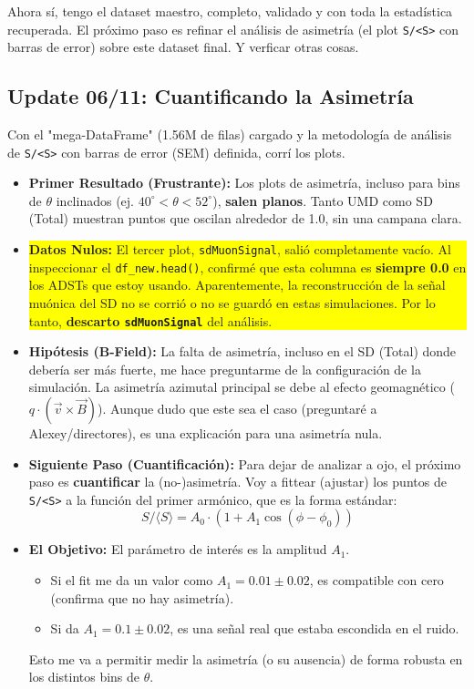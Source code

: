 Ahora sí, tengo el dataset maestro, completo, validado y con toda la estadística recuperada. El próximo paso es refinar el análisis de asimetría (el plot \lstinline|S/<S>| con barras de error) sobre este dataset final. Y verficar otras cosas.

\subsection*{Update 06/11: Cuantificando la Asimetría}

Con el "mega-DataFrame" (1.56M de filas) cargado y la metodología de análisis de \lstinline|S/<S>| con barras de error (SEM) definida, corrí los plots.

\begin{itemize}
	\item \textbf{Primer Resultado (Frustrante):} Los plots de asimetría, incluso para bins de $\theta$ inclinados (ej. $40^\circ < \theta < 52^\circ$), \textbf{salen planos}. Tanto UMD como SD (Total) muestran puntos que oscilan alrededor de 1.0, sin una campana clara.
	
	
	\item \colorbox{yellow}{
		\parbox{\dimexpr\textwidth-2\fboxsep}{%
		
		\textbf{Datos Nulos:} El tercer plot, \lstinline|sdMuonSignal|, salió completamente vacío. Al inspeccionar el \lstinline|df_new.head()|, confirmé que esta columna es \textbf{siempre 0.0} en los ADSTs que estoy usando. Aparentemente, la reconstrucción de la señal muónica del SD no se corrió o no se guardó en estas simulaciones. Por lo tanto, \textbf{descarto \lstinline|sdMuonSignal|} del análisis.}}
	
	\item \textbf{Hipótesis (B-Field):} La falta de asimetría, incluso en el SD (Total) donde debería ser más fuerte, me hace preguntarme de la configuración de la simulación. La asimetría azimutal principal se debe al efecto geomagnético ($q \cdot (\vec{v} \times \vec{B})$). Aunque dudo que este sea el caso (preguntaré a Alexey/directores), es una explicación para una asimetría nula.
	
	\item \textbf{Siguiente Paso (Cuantificación):} Para dejar de analizar a ojo, el próximo paso es \textbf{cuantificar} la (no-)asimetría. Voy a fittear (ajustar) los puntos de \lstinline|S/<S>| a la función del primer armónico, que es la forma estándar:
	$$ S/\langle S \rangle = A_0 \cdot (1 + A_1 \cos(\phi - \phi_0)) $$
	
	\item \textbf{El Objetivo:} El parámetro de interés es la amplitud $A_1$.
	\begin{itemize}
		\item Si el fit me da un valor como $A_1 = 0.01 \pm 0.02$, es compatible con cero (confirma que no hay asimetría).
		\item Si da $A_1 = 0.1 \pm 0.02$, es una señal real que estaba escondida en el ruido.
	\end{itemize}
	Esto me va a permitir medir la asimetría (o su ausencia) de forma robusta en los distintos bins de $\theta$.
\end{itemize}

